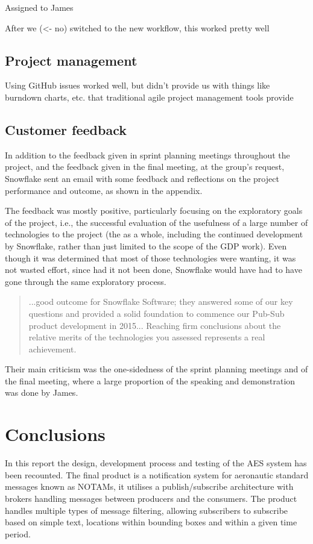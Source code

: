 \documentclass[a4paper, 12pt, twoside]{article}
\begin{document}
Assigned to James

After we (<- no) switched to the new workflow, this worked pretty well

\subsection{Project management}
\label{sec:eval_project_management}

Using GitHub issues worked well, but didn't provide us with things like burndown charts, etc. that traditional agile project management tools provide

\subsection{Customer feedback}
\label{sec:eval_customer_feedback}

In addition to the feedback given in sprint planning meetings throughout the project, and the feedback given in the final meeting, at the group's request, Snowflake sent an email with some feedback and reflections on the project performance and outcome, as shown in the appendix.

The feedback was mostly positive, particularly focusing on the exploratory goals of the project, i.e., the successful evaluation of the usefulness of a large number of technologies to the project (the as a whole, including the continued development by Snowflake, rather than just limited to the scope of the GDP work). Even though it was determined that most of those technologies were wanting, it was not wasted effort, since had it not been done, Snowflake would have had to have gone through the same exploratory process.

\blockquote{...good outcome for Snowflake Software; they answered some of our key questions and provided a solid foundation to commence our Pub-Sub product development in 2015... Reaching firm conclusions about the relative merits of the technologies you assessed represents a real achievement.}

Their main criticism was the one-sidedness of the sprint planning meetings and of the final meeting, where a large proportion of the speaking and demonstration was done by James.

\section{Conclusions}
\label{sec:conclusions}

In this report the design, development process and testing of the AES system has been recounted. The final product is a notification system for aeronautic standard messages known as NOTAMs, it utilises a publish/subscribe architecture with brokers handling messages between producers and the consumers. The product handles multiple types of message filtering, allowing subscribers to subscribe based on simple text, locations within bounding boxes and within a given time period.
\end{document}

